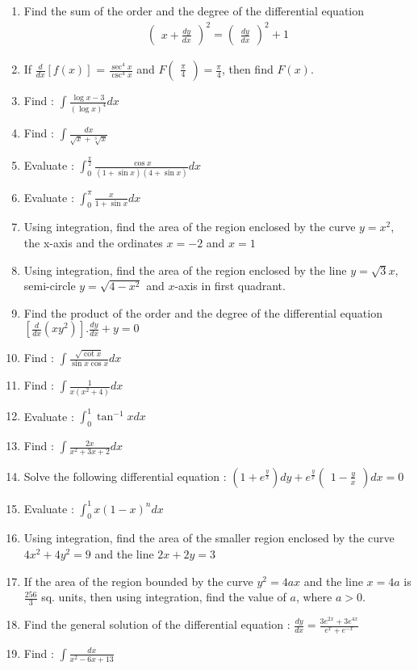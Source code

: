 \documentclass{article}
\newcommand{\myvec}[1]{\ensuremath{\begin{pmatrix}#1\end{pmatrix}}}
\begin{document}
\begin{enumerate}
	\item Find the sum of the order and the degree of the differential equation 
		\begin{align}
			\myvec{x + \frac{dy}{dx}}^2 = \myvec{\frac{dy}{dx}}^2 +1
		\end{align}
        \item If $\frac{d}{dx} [f(x)]$ = $\frac{\sec^4x}{\csc^4x}$ and $F\myvec{\frac{\pi}{4}} = \frac{\pi}{4}$, then find $F(x)$.
        \item Find : $\int \frac {\log x-3}{(\log x)^4} dx$
	\item Find : $\int \frac {dx}{\sqrt{x}+\sqrt[3]{x}}$
	\item Evaluate : $\int_0^\frac{\pi}{2} \frac{\cos x}{(1+\sin x)(4+\sin x)} dx$
	\item Evaluate : $\int_0^\pi \frac{x}{1+\sin x} dx$
	\item Using integration, find the area of the region enclosed by the curve $y = x^2$, the x-axis and the ordinates $x=-2$ and $x=1$
	\item Using integration, find the area of the region enclosed by the line $y = \sqrt{3}x$, semi-circle $y = \sqrt{4-x^2}$ and $x$-axis in first quadrant.
	\item Find the product of the order and the degree of the differential equation $[\frac{d}{dx}(xy^2)].\frac{dy}{dx}+y=0$
	\item Find : $\int \frac{\sqrt{\cot x}}{\sin x \cos x}dx$
	\item Find : $\int \frac{1}{x(x^2+4)}dx$
	\item Evaluate : $\int_0^1 \tan^{-1}x dx$
	\item Find : $\int \frac{2x}{x^2+3x+2}dx$
	\item Solve the following differential equation : $(1+e^{\frac{y}{x}}) dy + e^{\frac{y}{x}}\myvec{1-\frac{y}{x}} dx = 0$
	\item Evaluate : $\int_0^1 x(1-x)^n dx$
	\item Using integration, find the area of the smaller region enclosed by the curve $4x^2+4y^2=9$ and the line $2x+2y=3$
	\item If the area of the region bounded by the curve $y^2=4ax$ and the line $x=4a$ is $\frac{256}{3}$ sq. units, then using integration, find the value of $a$, where $a>0$.
	\item Find the general solution of the differential equation : $\frac{dy}{dx}=\frac{3e^{2x}+3e^{4x}}{e^x+e^{-x}}$
	\item Find : $\int \frac{dx}{x^2-6x+13}$

\end{enumerate}
\end{document}
